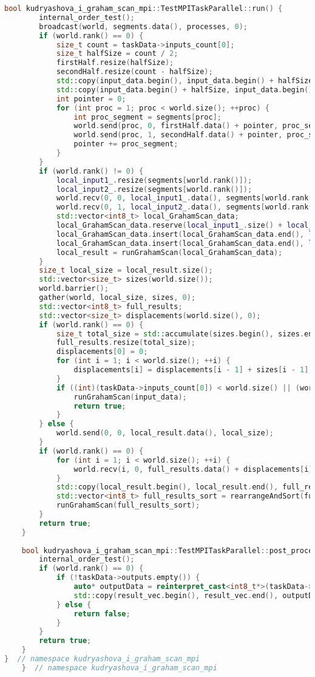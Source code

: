 \documentclass[a4paper,12pt]{article}
\begin{document}
\begin{lstlisting}[language=C++]
	bool kudryashova_i_graham_scan_mpi::TestMPITaskParallel::run() {
		internal_order_test();
		broadcast(world, segments.data(), processes, 0);
		if (world.rank() == 0) {
			size_t count = taskData->inputs_count[0];
			size_t halfSize = count / 2;
			firstHalf.resize(halfSize);
			secondHalf.resize(count - halfSize);
			std::copy(input_data.begin(), input_data.begin() + halfSize, firstHalf.begin());
			std::copy(input_data.begin() + halfSize, input_data.begin() + count, secondHalf.begin());
			int pointer = 0;
			for (int proc = 1; proc < world.size(); ++proc) {
				int proc_segment = segments[proc];
				world.send(proc, 0, firstHalf.data() + pointer, proc_segment);
				world.send(proc, 1, secondHalf.data() + pointer, proc_segment);
				pointer += proc_segment;
			}
		}
		if (world.rank() != 0) {
			local_input1_.resize(segments[world.rank()]);
			local_input2_.resize(segments[world.rank()]);
			world.recv(0, 0, local_input1_.data(), segments[world.rank()]);
			world.recv(0, 1, local_input2_.data(), segments[world.rank()]);
			std::vector<int8_t> local_GrahamScan_data;
			local_GrahamScan_data.reserve(local_input1_.size() + local_input2_.size());
			local_GrahamScan_data.insert(local_GrahamScan_data.end(), local_input1_.begin(), local_input1_.end());
			local_GrahamScan_data.insert(local_GrahamScan_data.end(), local_input2_.begin(), local_input2_.end());
			local_result = runGrahamScan(local_GrahamScan_data);
		}
		size_t local_size = local_result.size();
		std::vector<size_t> sizes(world.size());
		world.barrier();
		gather(world, local_size, sizes, 0);
		std::vector<int8_t> full_results;
		std::vector<size_t> displacements(world.size(), 0);
		if (world.rank() == 0) {
			size_t total_size = std::accumulate(sizes.begin(), sizes.end(), 0);
			full_results.resize(total_size);
			displacements[0] = 0;
			for (int i = 1; i < world.size(); ++i) {
				displacements[i] = displacements[i - 1] + sizes[i - 1];
			}
			if ((int)(taskData->inputs_count[0]) < world.size() || (world.size() == 1)) {
				runGrahamScan(input_data);
				return true;
			}
		} else {
			world.send(0, 0, local_result.data(), local_size);
		}
		if (world.rank() == 0) {
			for (int i = 1; i < world.size(); ++i) {
				world.recv(i, 0, full_results.data() + displacements[i], sizes[i]);
			}
			std::copy(local_result.begin(), local_result.end(), full_results.data() + displacements[world.rank()]);
			std::vector<int8_t> full_results_sort = rearrangeAndSort(full_results);
			runGrahamScan(full_results_sort);
		}
		return true;
	}
	
	bool kudryashova_i_graham_scan_mpi::TestMPITaskParallel::post_processing() {
		internal_order_test();
		if (world.rank() == 0) {
			if (!taskData->outputs.empty()) {
				auto* outputData = reinterpret_cast<int8_t*>(taskData->outputs[0]);
				std::copy(result_vec.begin(), result_vec.end(), outputData);
			} else {
				return false;
			}
		}
		return true;
	}
}  // namespace kudryashova_i_graham_scan_mpi
	}  // namespace kudryashova_i_graham_scan_mpi
\end{lstlisting}
\end{document}
